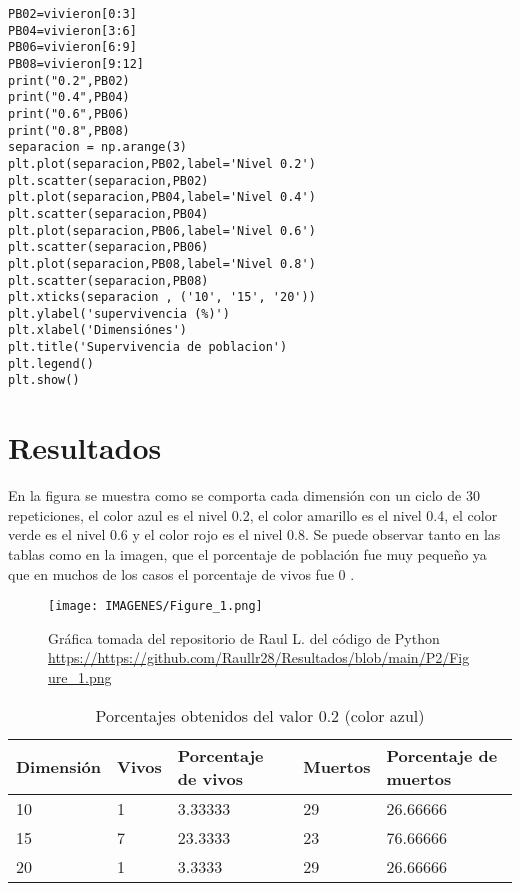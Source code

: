 \documentclass{article}
\begin{document}
\begin{verbatim}
PB02=vivieron[0:3]
PB04=vivieron[3:6]
PB06=vivieron[6:9]
PB08=vivieron[9:12]
print("0.2",PB02)
print("0.4",PB04)
print("0.6",PB06)
print("0.8",PB08)
separacion = np.arange(3)
plt.plot(separacion,PB02,label='Nivel 0.2')
plt.scatter(separacion,PB02)
plt.plot(separacion,PB04,label='Nivel 0.4')
plt.scatter(separacion,PB04)
plt.plot(separacion,PB06,label='Nivel 0.6')
plt.scatter(separacion,PB06)
plt.plot(separacion,PB08,label='Nivel 0.8')
plt.scatter(separacion,PB08)
plt.xticks(separacion , ('10', '15', '20'))
plt.ylabel('supervivencia (%)')
plt.xlabel('Dimensiónes')
plt.title('Supervivencia de poblacion')
plt.legend()
plt.show()
\end{verbatim}


\newpage
\section{Resultados}
En la figura se muestra como se comporta cada dimensión con un ciclo de 30 repeticiones, el color azul es el nivel 0.2, el color amarillo es el nivel 0.4, el color verde es el nivel 0.6 y el color rojo es el nivel 0.8. Se puede observar tanto en las tablas como en la imagen, que el porcentaje de población fue muy pequeño ya que en muchos de los casos el porcentaje de vivos fue 0 .

 \begin{figure}[h]
     \centering
     \texttt{[image: IMAGENES/Figure\_1.png]}
        \caption{Gráfica tomada del repositorio de Raul L. del código de Python 
    \url{https://https://github.com/Raullr28/Resultados/blob/main/P2/Figure_1.png}}
     \label{}
 \end{figure}
 
 \begin{table}[h]
 \caption{Porcentajes obtenidos del valor 0.2 (color azul) }
\centering
\begin{tabular}{ |p{2cm}||p{2cm}|p{2cm}|p{2cm}|p{2cm  }|}
 \hline
 Dimensión & Vivos & Porcentaje de vivos & Muertos & Porcentaje de muertos \\
 \hline
 10   & 1      & 3.33333 & 29      & 26.66666\\
 15   & 7      & 23.3333 & 23      & 76.66666\\
 20   & 1      & 3.3333  & 29      & 26.66666\\
 
 \hline
\end{tabular}
\label{table:1}
\end{table}
\end{document}
